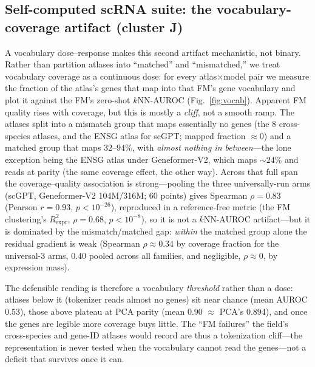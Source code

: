 \documentclass[fleqn,10pt,lineno]{wlpeerj}  %
\begin{document}
\subsection{Self-computed scRNA suite: the vocabulary-coverage artifact (cluster J)}
A vocabulary dose--response makes this second artifact mechanistic, not binary. Rather than partition atlases into ``matched'' and ``mismatched,'' we treat vocabulary coverage as a continuous dose: for every atlas$\times$model pair we measure the fraction of the atlas's genes that map into that FM's gene vocabulary and plot it against the FM's zero-shot $k$NN-AUROC (Fig.~\ref{fig:vocab}). Apparent FM quality rises with coverage, but this is mostly a \emph{cliff}, not a smooth ramp. The atlases split into a mismatch group that maps essentially no genes (the 8 cross-species atlases, and the ENSG atlas for scGPT; mapped fraction $\approx 0$) and a matched group that maps $32$--$94\%$, with \emph{almost nothing in between}---the lone exception being the ENSG atlas under Geneformer-V2, which maps ${\sim}24\%$ and reads at parity (the same coverage effect, the other way). Across that full span the coverage--quality association is strong---pooling the three universally-run arms (scGPT, Geneformer-V2 104M/316M; 60 points) gives Spearman $\rho=0.83$ (Pearson $r=0.93$, $p<10^{-26}$), reproduced in a reference-free metric (the FM clustering's $R^2_{\mathrm{expr}}$, $\rho=0.68$, $p<10^{-8}$), so it is not a $k$NN-AUROC artifact---but it is dominated by the mismatch/matched gap: \emph{within} the matched group alone the residual gradient is weak (Spearman $\rho\approx0.34$ by coverage fraction for the universal-3 arms, $0.40$ pooled across all families, and negligible, $\rho\!\approx\!0$, by expression mass).

The defensible reading is therefore a vocabulary \emph{threshold} rather than a dose: atlases below it (tokenizer reads almost no genes) sit near chance (mean AUROC 0.53), those above plateau at PCA parity (mean 0.90 $\approx$ PCA's 0.894), and once the genes are legible more coverage buys little. The ``FM failures'' the field's cross-species and gene-ID atlases would record are thus a tokenization cliff---the representation is never tested when the vocabulary cannot read the genes---not a deficit that survives once it can.
\end{document}
